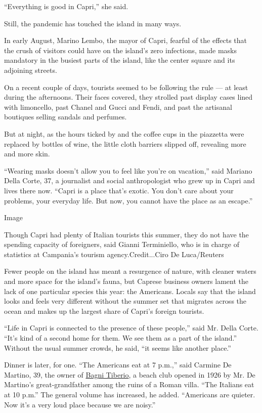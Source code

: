 ``Everything is good in Capri,'' she said.

Still, the pandemic has touched the island in many ways.

In early August, Marino Lembo, the mayor of Capri, fearful of the
effects that the crush of visitors could have on the island's zero
infections, made masks mandatory in the busiest parts of the island,
like the center square and its adjoining streets.

On a recent couple of days, tourists seemed to be following the rule ---
at least during the afternoons. Their faces covered, they strolled past
display cases lined with limoncello, past Chanel and Gucci and Fendi,
and past the artisanal boutiques selling sandals and perfumes.

But at night, as the hours ticked by and the coffee cups in the
piazzetta were replaced by bottles of wine, the little cloth barriers
slipped off, revealing more and more skin.

``Wearing masks doesn't allow you to feel like you're on vacation,''
said Mariano Della Corte, 37, a journalist and social anthropologist who
grew up in Capri and lives there now. ``Capri is a place that's exotic.
You don't care about your problems, your everyday life. But now, you
cannot have the place as an escape.''

Image

Though Capri had plenty of Italian tourists this summer, they do not
have the spending capacity of foreigners, said Gianni Terminiello, who
is in charge of statistics at Campania's tourism agency.Credit...Ciro De
Luca/Reuters

Fewer people on the island has meant a resurgence of nature, with
cleaner waters and more space for the island's fauna, but Caprese
business owners lament the lack of one particular species this year: the
Americans. Locals say that the island looks and feels very different
without the summer set that migrates across the ocean and makes up the
largest share of Capri's foreign tourists.

``Life in Capri is connected to the presence of these people,'' said Mr.
Della Corte. ``It's kind of a second home for them. We see them as a
part of the island.'' Without the usual summer crowds, he said, ``it
seems like another place.''

Dinner is later, for one. ``The Americans eat at 7 p.m.,'' said Carmine
De Martino, 39, the owner of
\href{https://www.bagnitiberio.com/en/index}{Bagni Tiberio}, a beach
club opened in 1926 by Mr. De Martino's great-grandfather among the
ruins of a Roman villa. ``The Italians eat at 10 p.m.'' The general
volume has increased, he added. ``Americans are quieter. Now it's a very
loud place because we are noisy.''

